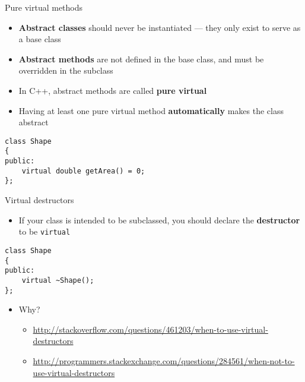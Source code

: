 \begin{frame}[fragile]{Pure virtual methods}
    \begin{itemize}
        \item \textbf{Abstract classes} should never be instantiated --- they only exist to serve as a base class \pause
        \item \textbf{Abstract methods} are not defined in the base class, and must be overridden in the subclass \pause
        \item In C++, abstract methods are called \textbf{pure virtual} \pause
        \item Having at least one pure virtual method \textbf{automatically} makes the class abstract
    \end{itemize}
    \pause
    \begin{lstlisting}
class Shape
{
public:
    virtual double getArea() = 0;
};
    \end{lstlisting}
\end{frame}

\begin{frame}[fragile]{Virtual destructors}
    \begin{itemize}
        \item If your class is intended to be subclassed, you should declare the \textbf{destructor} to be \lstinline{virtual}
    \end{itemize}
    \pause
    \begin{lstlisting}
class Shape
{
public:
    virtual ~Shape();
};
    \end{lstlisting}
    \pause
    \begin{itemize}
        \item Why?
        \begin{itemize}
            \item \footnotesize\url{http://stackoverflow.com/questions/461203/when-to-use-virtual-destructors}
            \item \footnotesize\url{http://programmers.stackexchange.com/questions/284561/when-not-to-use-virtual-destructors}
        \end{itemize}
    \end{itemize}
\end{frame}

